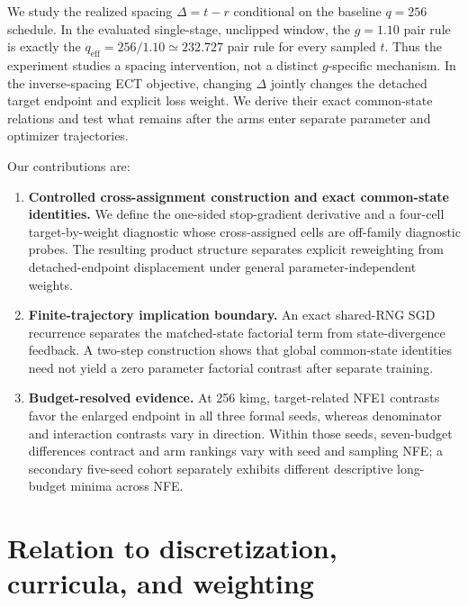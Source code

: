 \documentclass{article}
\newif\ifshowcomments
\newcommand{\claimnote}[1]{%
  \ifshowcomments{\color{claimpurple}\textbf{[CLAIM CEILING: #1]}}\fi}
\begin{document}
We study the realized spacing $\Delta=t-r$ conditional on the baseline
$q=256$ schedule. In the evaluated single-stage, unclipped window, the
$g=1.10$ pair rule is exactly the
$q_{\mathrm{eff}}=256/1.10\simeq232.727$ pair rule for every sampled $t$.
Thus the experiment studies a spacing intervention, not a distinct
$g$-specific mechanism. In the inverse-spacing ECT objective, changing
$\Delta$ jointly changes the detached target endpoint and explicit loss
weight. We derive their exact common-state relations and test what remains
after the arms enter separate parameter and optimizer trajectories.

Our contributions are:
\begin{enumerate}
  \item \textbf{Controlled cross-assignment construction and exact common-state
  identities.}
  We define the one-sided stop-gradient derivative and a four-cell
  target-by-weight diagnostic whose cross-assigned cells are off-family
  diagnostic probes. The resulting product structure separates explicit
  reweighting from detached-endpoint displacement under general
  parameter-independent weights.

  \item \textbf{Finite-trajectory implication boundary.}
  An exact shared-RNG SGD recurrence separates the matched-state factorial
  term from state-divergence feedback. A two-step construction shows that
  global common-state identities need not yield a zero parameter factorial
  contrast after separate training.

  \item \textbf{Budget-resolved evidence.}
  At 256 kimg, target-related NFE1 contrasts favor the enlarged endpoint in
  all three formal seeds, whereas denominator and interaction contrasts vary
  in direction. Within those seeds, seven-budget differences contract and arm
  rankings vary with seed and sampling NFE; a secondary five-seed cohort
  separately exhibits different descriptive long-budget minima across NFE.
\end{enumerate}

\claimnote{Keep the novelty boundary at the controlled cross-assignment construction,
exact common-state identities, and the finite-trajectory implication boundary.
The chain-rule product identity is algebraic infrastructure, not a standalone
deep theorem. Do not re-center the narrative on RAdam history, balanced beta,
optimizer scale invariance, or a universal best gap.}

\section{Relation to discretization, curricula, and weighting}
\label{sec:related-work}
\end{document}
